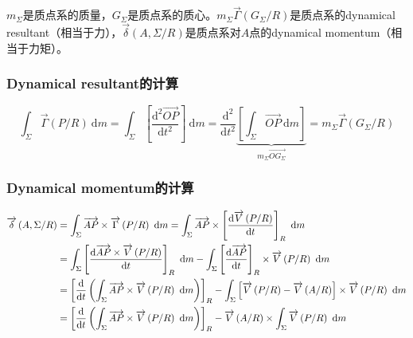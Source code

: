\documentclass[UTF8]{ctexart}%
\begin{document}
$m_{\Sigma}$是质点系的质量，$G_{\Sigma}$是质点系的质心。$m_{\Sigma}\overrightarrow{\Gamma}\left(G_{\Sigma}/R\right)$是质点系的dynamical resultant（相当于力），$\overrightarrow{\delta}\left(A, \Sigma/R\right)$是质点系对$A$点的dynamical momentum（相当于力矩）。

\subsubsection{Dynamical resultant的计算}
\label{sec:DynamicalResultant的计算}
\begin{equation}
\int_{\Sigma}\overrightarrow{\Gamma}\left(P/R\right)\ \mathrm{d}m=\int_{\Sigma}\left[\frac{\mathrm{d}^2 \overrightarrow{OP}}{\mathrm{d}t^2}\right]\ \mathrm{d}m=\frac{\mathrm{d}^2}{\mathrm{d}t^2}\underbrace{\left[\int_{\Sigma}\overrightarrow{OP}\ \mathrm{d}m\right]}_{m_{\Sigma}\overrightarrow{OG_{\Sigma}}}=m_{\Sigma}\overrightarrow{\Gamma}\left(G_{\Sigma}/R\right)
\end{equation}

\subsubsection{Dynamical momentum的计算}
\label{sec:DynamicalMomentum的计算}
\begin{align}
\overrightarrow{\delta}\left(A, \Sigma/R\right)&=\int_{\Sigma}\overrightarrow{AP}\times\overrightarrow{\Gamma}\left(P/R\right)\ \mathrm{d}m=\int_{\Sigma}\overrightarrow{AP}\times\left[\frac{\mathrm{d}\overrightarrow{V}\left(P/R\right)}{\mathrm{d}t} \right]_R\ \mathrm{d}m\notag \\
&=\int_{\Sigma}\left[\frac{\mathrm{d}\overrightarrow{AP}\times\overrightarrow{V}\left(P/R\right)}{\mathrm{d}t} \right]_R\ \mathrm{d}m-\int_{\Sigma}\left[\frac{\mathrm{d}\overrightarrow{AP}}{\mathrm{d}t}\right]_R\times\overrightarrow{V}\left(P/R\right)\ \mathrm{d}m \notag \\
&=\left[\frac{\mathrm{d}}{\mathrm{d}t}\left(\int_{\Sigma}\overrightarrow{AP}\times\overrightarrow{V}\left(P/R\right)\ \mathrm{d}m\right)\right]_R-\int_{\Sigma}\left[\overrightarrow{V}\left(P/R\right)-\overrightarrow{V}\left(A/R\right)\right]\times\overrightarrow{V}\left(P/R\right)\ \mathrm{d}m \notag \\
&=\left[\frac{\mathrm{d}}{\mathrm{d}t}\left(\int_{\Sigma}\overrightarrow{AP}\times\overrightarrow{V}\left(P/R\right)\ \mathrm{d}m\right)\right]_R-\overrightarrow{V}\left(A/R\right)\times\int_{\Sigma}\overrightarrow{V}\left(P/R\right)\ \mathrm{d}m	
\end{align}
\end{document}
